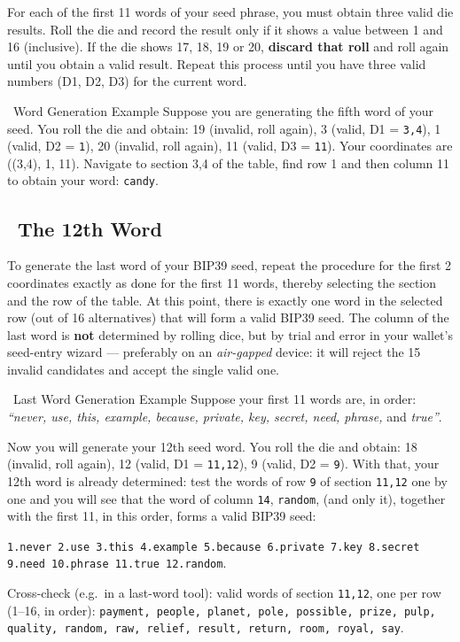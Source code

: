 \documentclass[10pt]{article}
\begin{document}
For each of the first 11 words of your seed phrase, you must obtain three valid die results. Roll the die and record the result only if it shows a value between 1 and 16 (inclusive). If the die shows 17, 18, 19 or 20, \textbf{discard that roll} and roll again until you obtain a valid result. Repeat this process until you have three valid numbers (D1, D2, D3) for the current word.

\begin{examplebox}{\faLightbulb~Word Generation Example}
Suppose you are generating the fifth word of your seed. You roll the die and obtain: 19 (invalid, roll again), 3 (valid, D1 = \texttt{3,4}), 1 (valid, D2 = \texttt{1}), 20 (invalid, roll again), 11 (valid, D3 = \texttt{11}). Your coordinates are ((3,4), 1, 11). Navigate to section 3,4 of the table, find row 1 and then column 11 to obtain your word: \texttt{candy}.
\end{examplebox}

\subsection*{\faPen~The 12th Word}

To generate the last word of your BIP39 seed, repeat the procedure for the first 2 coordinates exactly as done for the first 11 words, thereby selecting the section and the row of the table. At this point, there is exactly one word in the selected row (out of 16 alternatives) that will form a valid BIP39 seed. The column of the last word is \textbf{not} determined by rolling dice, but by trial and error in your wallet's seed-entry wizard --- preferably on an \textit{air-gapped} device: it will reject the 15 invalid candidates and accept the single valid one.

\begin{examplebox}{\faLightbulb~Last Word Generation Example}
Suppose your first 11 words are, in order: \textit{``never, use, this, example, because, private, key, secret, need, phrase,} and \textit{true''}.

Now you will generate your 12th seed word. You roll the die and obtain: 18 (invalid, roll again), 12 (valid, D1 = \texttt{11,12}), 9 (valid, D2 = \texttt{9}). With that, your 12th word is already determined: test the words of row \texttt{9} of section \texttt{11,12} one by one and you will see that the word of column \texttt{14}, \texttt{random}, (and only it), together with the first 11, in this order, forms a valid BIP39 seed:

\vspace{0.5em}
\texttt{1.never 2.use 3.this 4.example 5.because 6.private 7.key 8.secret 9.need 10.phrase 11.true 12.random}. \faCheckCircle
\vspace{0.25em}

{\scriptsize Cross-check (e.g.\ in a last-word tool): valid words of section \texttt{11,12}, one per row (1--16, in order): \texttt{payment, people, planet, pole, possible, prize, pulp, quality, random, raw, relief, result, return, room, royal, say}.\par}
\end{examplebox}
\end{document}
